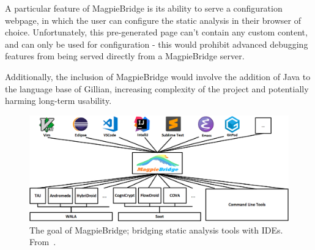 A particular feature of MagpieBridge is its ability to serve a configuration
webpage, in which the user can configure the static analysis in their browser
of choice. Unfortunately, this pre-generated page can't contain any custom
content, and can only be used for configuration - this would prohibit advanced
debugging features from being served directly from a MagpieBridge server.

Additionally, the inclusion of MagpieBridge would involve the addition of Java
to the language base of Gillian, increasing complexity of the project and
potentially harming long-term usability.


\begin{figure}
  \centering
  \includegraphics[width=\textwidth]{img/magpiebridge-goal.png}
  \caption{
    The goal of MagpieBridge; bridging static analysis tools with IDEs.
    From~\cite{magpiebridge-repo}.
  }
  \label{fig:magpiebridge-goal}
\end{figure}
